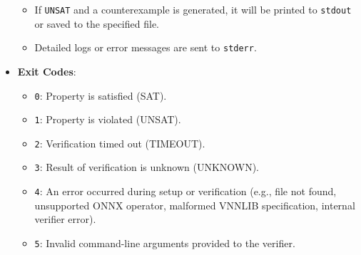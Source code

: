 \begin{itemize}
\begin{itemize}
        \item If \texttt{UNSAT} and a counterexample is generated, it will be printed to \texttt{stdout} or saved to the specified file.
        \item Detailed logs or error messages are sent to \texttt{stderr}.
    \end{itemize}
    \item \textbf{Exit Codes}:
    \begin{itemize}
        \item \texttt{0}: Property is satisfied (SAT).
        \item \texttt{1}: Property is violated (UNSAT).
        \item \texttt{2}: Verification timed out (TIMEOUT).
        \item \texttt{3}: Result of verification is unknown (UNKNOWN).
        \item \texttt{4}: An error occurred during setup or verification (e.g., file not found, unsupported ONNX operator, malformed VNNLIB specification, internal verifier error).
        \item \texttt{5}: Invalid command-line arguments provided to the verifier.
    \end{itemize}
\end{itemize}

